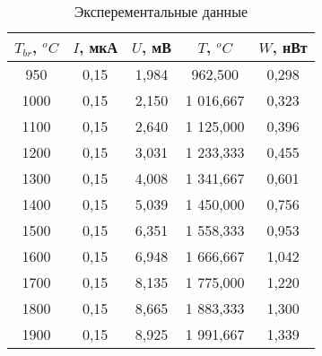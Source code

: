 \begin{table}[]
    \centering
    \begin{tabular}{|c|c|c|c|c|}
    \hline
    $T_{br}$, $^oC$   & $I$, мкА    & $U$, мВ     & $T$, $^oC$         & $W$, нВт     \\ \hline
    950               & 0,15        & 1,984       & 962,500            & 0,298        \\ \hline
    1000              & 0,15        & 2,150       & 1 016,667          & 0,323        \\ \hline
    1100              & 0,15        & 2,640       & 1 125,000          & 0,396        \\ \hline
    1200              & 0,15        & 3,031       & 1 233,333          & 0,455        \\ \hline
    1300              & 0,15        & 4,008       & 1 341,667          & 0,601        \\ \hline
    1400              & 0,15        & 5,039       & 1 450,000          & 0,756        \\ \hline
    1500              & 0,15        & 6,351       & 1 558,333          & 0,953        \\ \hline
    1600              & 0,15        & 6,948       & 1 666,667          & 1,042        \\ \hline
    1700              & 0,15        & 8,135       & 1 775,000          & 1,220        \\ \hline
    1800              & 0,15        & 8,665       & 1 883,333          & 1,300        \\ \hline
    1900              & 0,15        & 8,925       & 1 991,667          & 1,339        \\ \hline
    \end{tabular}
    \caption{Эксперементальные данные}
    \label{table:1}
\end{table}